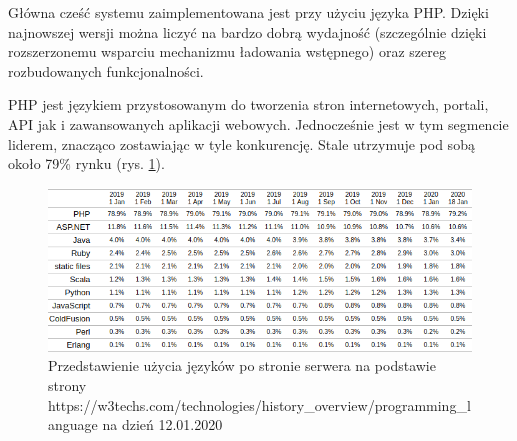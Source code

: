 Główna cześć systemu zaimplementowana jest przy użyciu języka PHP. Dzięki najnowszej wersji można liczyć na bardzo dobrą wydajność (szczególnie dzięki rozszerzonemu wsparciu mechanizmu ładowania wstępnego) oraz szereg rozbudowanych funkcjonalności. 

PHP jest językiem przystosowanym do tworzenia stron internetowych, portali, API jak i zawansowanych aplikacji webowych. Jednocześnie jest w tym segmencie liderem, znacząco zostawiając w tyle konkurencję. Stale utrzymuje pod sobą około 79\% rynku (rys. \ref{fig:php}).

\begin{figure}[H]
    \centering
    \includegraphics[width=6in]{images/php.png}
    \caption{Przedstawienie użycia języków po stronie serwera na podstawie strony https://w3techs.com/technologies/history\_overview/programming\_language na dzień 12.01.2020  \label{fig:php}}
\end{figure}